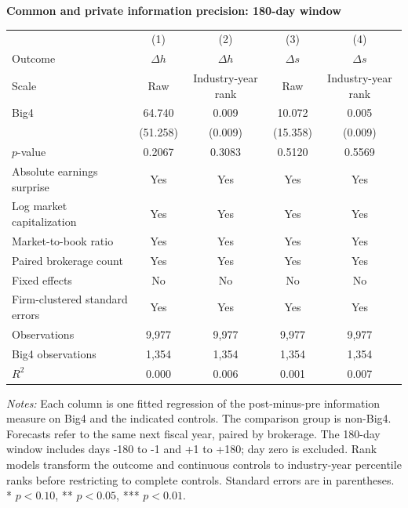 \documentclass[10pt]{article}
\begin{document}
\begin{minipage}{18.4cm}
\fontsize{10}{12}\selectfont
\setlength{\tabcolsep}{4pt}\renewcommand{\arraystretch}{1.12}
{\large\bfseries Common and private information precision: 180-day window}\par\medskip
\begin{tabular*}{\linewidth}{@{\extracolsep{\fill}}lcccc@{}}
\toprule
 & (1) & (2) & (3) & (4) \\
Outcome & $\Delta h$ & $\Delta h$ & $\Delta s$ & $\Delta s$ \\
Scale & Raw & Industry-year rank & Raw & Industry-year rank \\
\midrule
Big4 & 64.740 & 0.009 & 10.072 & 0.005 \\
 & (51.258) & (0.009) & (15.358) & (0.009) \\
$p$-value & 0.2067 & 0.3083 & 0.5120 & 0.5569 \\
\midrule
Absolute earnings surprise & Yes & Yes & Yes & Yes \\
Log market capitalization & Yes & Yes & Yes & Yes \\
Market-to-book ratio & Yes & Yes & Yes & Yes \\
Paired brokerage count & Yes & Yes & Yes & Yes \\
Fixed effects & No & No & No & No \\
Firm-clustered standard errors & Yes & Yes & Yes & Yes \\
Observations & 9,977 & 9,977 & 9,977 & 9,977 \\
Big4 observations & 1,354 & 1,354 & 1,354 & 1,354 \\
$R^2$ & 0.000 & 0.006 & 0.001 & 0.007 \\
\bottomrule\end{tabular*}\par\medskip
\fontsize{9}{11}\selectfont\textit{Notes:} Each column is one fitted regression of the post-minus-pre information measure on Big4 and the indicated controls. The comparison group is non-Big4. Forecasts refer to the same next fiscal year, paired by brokerage. The 180-day window includes days -180 to -1 and +1 to +180; day zero is excluded. Rank models transform the outcome and continuous controls to industry-year percentile ranks before restricting to complete controls. Standard errors are in parentheses. * $p<0.10$, ** $p<0.05$, *** $p<0.01$.
\end{minipage}
\end{document}
